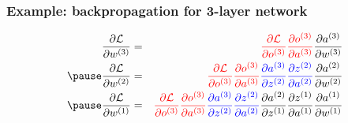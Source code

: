 \documentclass[smaller]{beamer}
\begin{document}
\begin{frame}
  \frametitle{Example: backpropagation for 3-layer network}
  \pause
{}
\pause
\vspace{-2ex}
\begin{eqnarray}
 \pd{\mc{L}}{w^{(3)}} &=&  {\rd \pd{\mc{L}}{o^{(3)}}\pd{o^{(3)}}{a^{(3)}}} \pd{a^{(3)}}{w^{(3)}}\\\pause
 \pd{\mc{L}}{w^{(2)}} &=&  {\rd \pd{\mc{L}}{o^{(3)}}\pd{o^{(3)}}{a^{(3)}}}  {\bl \pd{a^{(3)}}{z^{(2)}}  \pd{z^{(2)}}{a^{(2)}}} \pd{a^{(2)}}{w^{(2)}} \\\pause
 \pd{\mc{L}}{w^{(1)}} &=&  {\rd \pd{\mc{L}}{o^{(3)}}\pd{o^{(3)}}{a^{(3)}}}  {\bl \pd{a^{(3)}}{z^{(2)}}  \pd{z^{(2)}}{a^{(2)}}}   \pd{a^{(2)}}{z^{(1)}} \pd{z^{(1)}}{a^{(1)}} \pd{a^{(1)}}{w^{(1)}}
\end{eqnarray}
\end{frame}









\end{document}
